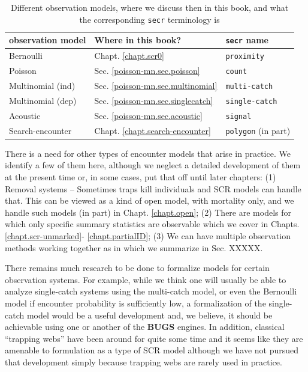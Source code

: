\begin{table}[ht]
\centering
\caption{
Different observation models, where we discuss then in this
  book, and what the corresponding \mbox{\tt secr} terminology is
}
\begin{tabular}{lll}
\hline \hline
observation model & Where in this book?  &  \mbox{\tt secr} name  \\ \hline
Bernoulli         & Chapt. \ref{chapt.scr0}    &   \mbox{\tt proximity} \\
Poisson           & Sec. \ref{poisson-mn.sec.poisson} & \mbox{\tt count} \\
Multinomial (ind) & Sec. \ref{poisson-mn.sec.multinomial} & \mbox{\tt  multi-catch} \\
Multinomial (dep) & Sec. \ref{poisson-mn.sec.singlecatch} & \mbox{\tt  single-catch} \\
Acoustic          & Sec. \ref{poisson-mn.sec.acoustic}
   &  \mbox{\tt signal}  \\
Search-encounter      & Chapt. \ref{chapt.search-encounter}  &
\mbox{\tt polygon} (in part) \\ \hline
\end{tabular}
\label{poisson-mn.tab.models}
\end{table}

There is a need for other types of encounter models that arise in practice. We
identify a few of them here, although we neglect a detailed
development of them at the present time or, in some cases, put that
off until later chapters: (1) Removal systems -- Sometimes traps kill
individuals and SCR models can handle that. This can be viewed as a
kind of open model, with mortality only, and we handle such models (in
part) in %
Chapt. \ref{chapt.open};  (2) There are models for which only specific
summary statistics are observable
\citep{chandler_royle:2012,sollmann_etal:2012ecol} which we cover in
Chapts. \ref{chapt.scr-unmarked}- \ref{chapt.partialID}; (3) We can
have multiple observation methods working together as in
\citet{gopalaswamy_etal:2012ecol} which we summarize in Sec. XXXXX.

There remains much research to be done to formalize models for certain
observation systems. For example, while we think one will usually be
able to analyze single-catch systems using the multi-catch model, or
even the Bernoulli model if encounter probability is sufficiently low,
a formalization of the single-catch model would be a useful
development and, we believe, it should be achievable using one or
another of the {\bf BUGS} engines.  In addition, classical ``trapping
webs'' \citep{anderson_etal:1983, wilson_anderson:1985b,
  jett_nichols:1987, parmenter_etal:1989,link_barker:1994} 
have been around for quite
some time and it seems like they are amenable to formulation as a type
of SCR model although we have not pursued that development simply
because trapping webs are rarely used in practice.

